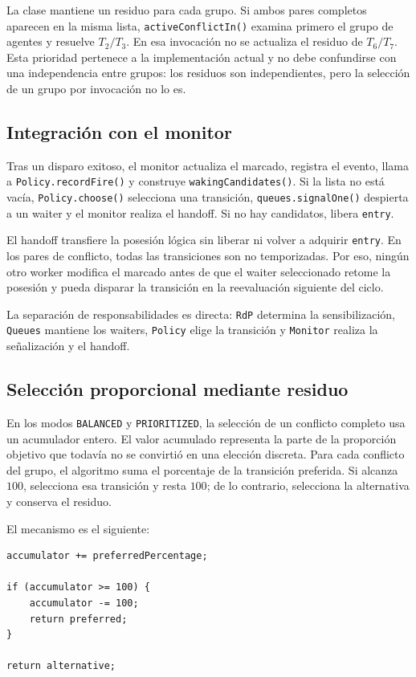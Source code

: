 \documentclass[11pt,a4paper]{article}
\begin{document}
La clase mantiene un residuo para cada grupo. Si ambos pares completos aparecen en la misma lista, \texttt{activeConflictIn()} examina primero el grupo de agentes y resuelve $T_2/T_3$. En esa invocación no se actualiza el residuo de $T_6/T_7$. Esta prioridad pertenece a la implementación actual y no debe confundirse con una independencia entre grupos: los residuos son independientes, pero la selección de un grupo por invocación no lo es.

\subsection{Integración con el monitor}

Tras un disparo exitoso, el monitor actualiza el marcado, registra el evento, llama a \texttt{Policy.recordFire()} y construye \texttt{wakingCandidates()}. Si la lista no está vacía, \texttt{Policy.choose()} selecciona una transición, \texttt{queues.signalOne()} despierta a un waiter y el monitor realiza el handoff. Si no hay candidatos, libera \texttt{entry}.

El handoff transfiere la posesión lógica sin liberar ni volver a adquirir \texttt{entry}. En los pares de conflicto, todas las transiciones son no temporizadas. Por eso, ningún otro worker modifica el marcado antes de que el waiter seleccionado retome la posesión y pueda disparar la transición en la reevaluación siguiente del ciclo.

La separación de responsabilidades es directa: \texttt{RdP} determina la sensibilización, \texttt{Queues} mantiene los waiters, \texttt{Policy} elige la transición y \texttt{Monitor} realiza la señalización y el handoff.

\subsection{Selección proporcional mediante residuo}

En los modos \texttt{BALANCED} y \texttt{PRIORITIZED}, la selección de un conflicto completo usa un acumulador entero. El valor acumulado representa la parte de la proporción objetivo que todavía no se convirtió en una elección discreta. Para cada conflicto del grupo, el algoritmo suma el porcentaje de la transición preferida. Si alcanza $100$, selecciona esa transición y resta $100$; de lo contrario, selecciona la alternativa y conserva el residuo.

El mecanismo es el siguiente:

\begin{lstlisting}[frame=single]
accumulator += preferredPercentage;

if (accumulator >= 100) {
    accumulator -= 100;
    return preferred;
}

return alternative;
\end{lstlisting}
\end{document}
